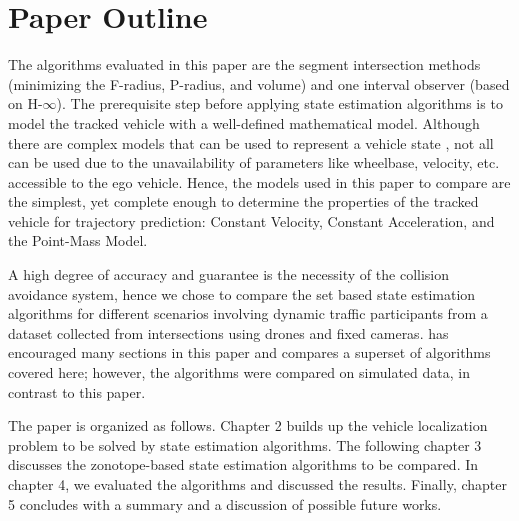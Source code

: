 \section{Paper Outline}
The algorithms evaluated in this paper are the segment intersection methods (minimizing the F-radius, P-radius, and volume) and one interval observer (based on H-$\infty$). The prerequisite step before applying state estimation algorithms is to model the tracked vehicle with a well-defined mathematical model. Although there are complex models that can be used to represent a vehicle state \cite{Althoff}, not all can be used due to the unavailability of parameters like wheelbase, velocity, etc. accessible to the ego vehicle. Hence, the models used in this paper to compare are the simplest, yet complete enough to determine the properties of the tracked vehicle for trajectory prediction: Constant Velocity, Constant Acceleration, and the Point-Mass Model.

A high degree of accuracy and guarantee is the necessity of the collision avoidance system, hence we chose to compare the set based state estimation algorithms for different scenarios involving dynamic traffic participants from a dataset collected from intersections using drones and fixed cameras. \cite{Rath} has encouraged many sections in this paper and compares a superset of algorithms covered here; however, the algorithms were compared on simulated data, in contrast to this paper.

The paper is organized as follows. Chapter 2 builds up the vehicle localization problem to be solved by state estimation algorithms. The following chapter 3 discusses the zonotope-based state estimation algorithms to be compared. In chapter 4, we evaluated the algorithms and discussed the results. Finally, chapter 5 concludes with a summary and a discussion of possible future works.




